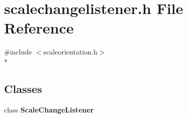 \section{scalechangelistener.\+h File Reference}
\label{scalechangelistener_8h}
{\ttfamily \#include $<$scaleorientation.\+h$>$}\\*
\subsection*{Classes}
\begin{DoxyCompactItemize}
\item 
class {\bf Scale\+Change\+Listener}
\end{DoxyCompactItemize}
